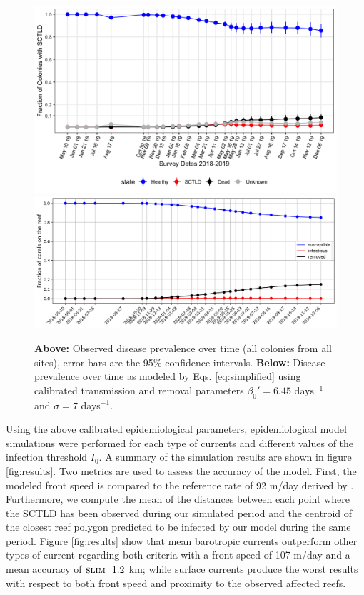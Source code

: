 \documentclass[utf8]{frontiersSCNS}
\newcommand{\slim}{\textsc{slim}\ }
\begin{document}
\begin{figure}
    \centering
    \includegraphics[width=.7\textwidth]{figures/image2.png}
    \includegraphics[width=.69\textwidth]{figures/sir_obs.png}
    \caption{\textbf{Above:} Observed disease prevalence over time (all colonies from all sites), error bars are the 95\% confidence intervals. \textbf{Below:} Disease prevalence over time as modeled by Eqs. \ref{eq:simplified} using calibrated transmission and removal parameters  $\beta_0'=6.45$ days$^{-1}$ and $\sigma=7$ days$^{-1}$.}
    \label{fig:calibration}
\end{figure}

Using the above calibrated epidemiological parameters, epidemiological model simulations were performed for each type of currents and different values of the infection threshold $I_0$. A summary of the simulation results are shown in figure \ref{fig:results}. Two metrics are used to assess the accuracy of the model. First, the modeled front speed is compared to the reference rate of 92 m/day derived by \citep{muller2020spatial}. Furthermore, we compute the mean of the distances between each point where the SCTLD has been observed during our simulated period and the centroid of the closest reef polygon predicted to be infected by our model during the same period. Figure \ref{fig:results} show that mean barotropic currents outperform other types of current regarding both criteria with a front speed of 107 m/day and a mean accuracy of $\slim ~1.2$ km; while surface currents produce the worst results with respect to both front speed and proximity to the observed affected reefs.
\end{document}
